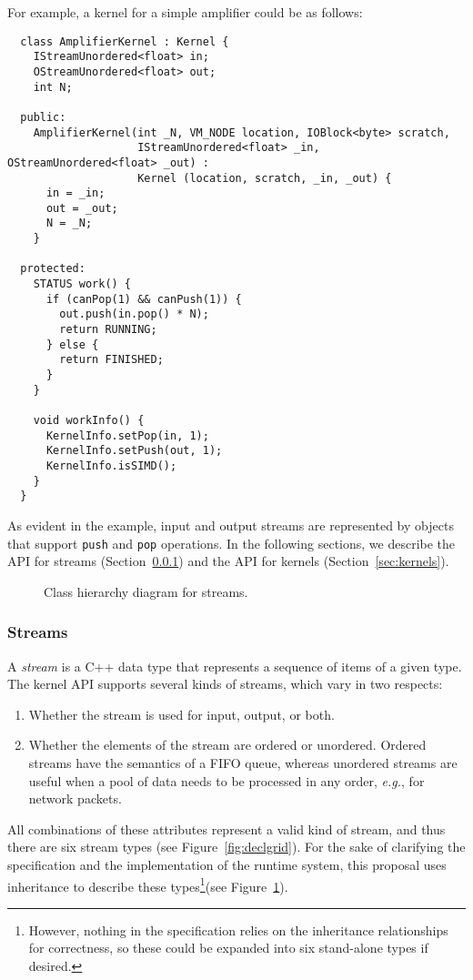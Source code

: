 \noindent For example, a kernel for a simple amplifier could be as follows:
{\small
\begin{verbatim}
  class AmplifierKernel : Kernel {
    IStreamUnordered<float> in;
    OStreamUnordered<float> out;
    int N;

  public:
    AmplifierKernel(int _N, VM_NODE location, IOBlock<byte> scratch, 
                    IStreamUnordered<float> _in, OStreamUnordered<float> _out) : 
                    Kernel (location, scratch, _in, _out) {
      in = _in;
      out = _out;
      N = _N;
    }

  protected:
    STATUS work() {
      if (canPop(1) && canPush(1)) {
        out.push(in.pop() * N);
        return RUNNING;
      } else {
        return FINISHED;
      }
    }

    void workInfo() {
      KernelInfo.setPop(in, 1);
      KernelInfo.setPush(out, 1);
      KernelInfo.isSIMD();
    }
  }  
\end{verbatim}}
As evident in the example, input and output streams are represented by
objects that support {\tt push} and {\tt pop} operations.  In the
following sections, we describe the API for streams
(Section~\ref{sec:kerstreams}) and the API for kernels
(Section~\ref{sec:kernels}).

\begin{figure}[t]
\begin{center}
\end{center}
\vspace{-12pt}
\caption{Class hierarchy diagram for streams.\protect\label{fig:inherit}}
\end{figure}



\subsubsection{Streams}
\label{sec:kerstreams}

A {\it stream} is a C++ data type that represents a sequence of items
of a given type.  The kernel API supports several kinds of streams,
which vary in two respects: 
\begin{enumerate}

\item Whether the stream is used for input, output, or both.

\item Whether the elements of the stream are ordered or unordered.
Ordered streams have the semantics of a FIFO queue, whereas unordered
streams are useful when a pool of data needs to be processed in any
order, {\it e.g.}, for network packets.

\end{enumerate}
All combinations of these attributes represent a valid kind of stream,
and thus there are six stream types (see Figure~\ref{fig:declgrid}).
For the sake of clarifying the specification and the implementation of
the runtime system, this proposal uses inheritance to describe these
types\footnote{However, nothing in the specification relies on the
inheritance relationships for correctness, so these could be expanded
into six stand-alone types if desired.}(see Figure~\ref{fig:inherit}).

